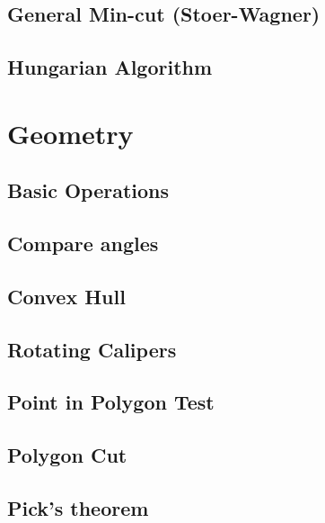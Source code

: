 \documentclass[10pt,landscape,a4paper,twocolumn]{article}
\begin{document}
\subsection{General Min-cut (Stoer-Wagner)}


\subsection{Hungarian Algorithm}


\section{Geometry}

\subsection{Basic Operations}


\subsection{Compare angles}


\subsection{Convex Hull}


\subsection{Rotating Calipers}


\subsection{Point in Polygon Test}


\subsection{Polygon Cut}


\subsection{Pick's theorem}
\end{document}
